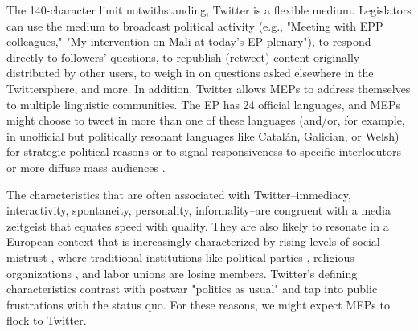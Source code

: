 \documentclass{article}\usepackage[]{graphicx}\usepackage[]{color}
\begin{document}
		The 140-character limit notwithstanding, Twitter is a flexible medium. Legislators can use the medium to broadcast political activity (e.g., "Meeting with EPP colleagues," "My intervention on Mali at today's EP plenary"), to respond directly to followers' questions, to republish (retweet) content originally distributed by other users, to weigh in on questions asked elsewhere in the Twittersphere, and more. In addition, Twitter allows MEPs to address themselves to multiple linguistic communities. The EP has 24 official languages, and MEPs might choose to tweet in more than one of these languages (and/or, for example, in unofficial but politically resonant languages like Catalán, Galician, or Welsh) for strategic political reasons or to signal responsiveness to specific interlocutors or more diffuse mass audiences \citep*{deSwaan.1993}.
	 
		The characteristics that are often associated with Twitter--immediacy, interactivity, spontaneity, personality, informality--are congruent with a media zeitgeist that equates speed with quality. They are also likely to resonate in a European context that is increasingly characterized by rising levels of social mistrust \citep*{dogan.2005, pharr.putnam.dalton.2000}, where traditional institutions like political parties \citep*{vanbiezen.poguntke.2014, vanbiezen.mair.poguntke.2012, whitely.2011}, religious organizations \citep*{burkimsher.2014, voas.2007, voas.2009}, and labor unions \citep*{ebbinghaus.2002, vanbiezen.poguntke.2014} are losing members. Twitter's defining characteristics contrast with postwar "politics as usual" and tap into public frustrations with the status quo. For these reasons, we might expect MEPs to flock to Twitter.
		
\end{document}
